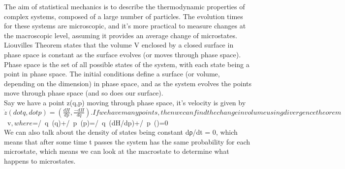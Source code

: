 The aim of statistical mechanics is to describe the thermodynamic properties of complex systems, composed of a large number of particles. The evolution times for these systems are microscopic, and it’s more practical to measure changes at the macroscopic level, assuming it provides an average change of microstates.\\
Liouvilles Theorem states that the volume V enclosed by a closed surface in phase space is constant as the surface evolves (or moves through phase space). \\
Phase space is the set of all possible states of the system, with each state being a point in phase space. The initial conditions define a surface (or volume, depending on the dimension) in phase space, and as the system evolves the points move through phase space (and so does our surface). \\
Say we have a point z(q,p) moving through phase space, it’s velocity is given by $\dot{z}(dot{q},dot{p})=(\frac{dH}{dp}, \frac{-dH}{dq}). If we have many points, then we can find the change in volume using divergence theorem $\int\nabla\ast\ v\dV$, where $\nabla\astv=\partial/\partial\ q\ (q\ast)+\partial/\partial\ p\ (p\ast)=\partial/\partial\ q\ (dH/dp)+\partial/\partial\ p\ ()=0\\ 

We can also talk about the density of states being constant dρ/dt = 0, which means that after some time t passes the system has the same probability for each microstate, which means we can look at the macrostate to determine what happens to microstates. 

